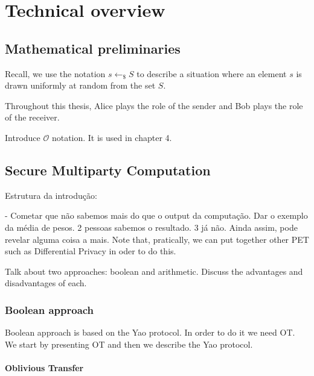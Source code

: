 


%

\chapter{Technical overview}

\section{Mathematical preliminaries}

Recall, we use the notation $s\leftarrow_{\$}S$ to describe a situation where an element $s$ is drawn uniformly at random from the set $S$.

Throughout this thesis, Alice plays the role of the sender and Bob plays the role of the receiver.

Introduce $\mathcal{O}$ notation. It is used in chapter 4.


\section{Secure Multiparty Computation}


Estrutura da introdução:

- Cometar que não sabemos mais do que o output da computação. Dar o exemplo da média de pesos. 2 pessoas sabemos o resultado. 3 já não. Ainda assim, pode revelar alguma coisa a mais. Note that, pratically, we can put together other PET such as Differential Privacy in oder to do this.




Talk about two approaches: boolean and arithmetic. Discuss the advantages and disadvantages of each.

\subsection{Boolean approach}

Boolean approach is based on the Yao protocol. In order to do it we need OT. We start by presenting OT and then we describe the Yao protocol.


\subsubsection{Oblivious Transfer}

